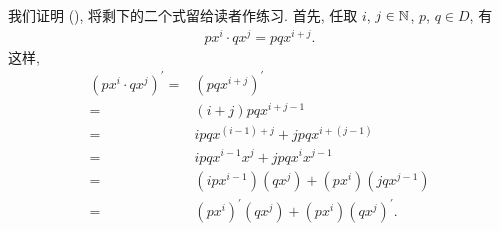 \begin{pf}
    我们证明 (), 将剩下的二个式留给读者作练习. 首先, 任取 $i$, $j \in \mathbb{N}$, $p$, $q \in D$, 有
    \begin{align*}
        px^i \cdot qx^j = pqx^{i+j}.
    \end{align*}
    这样,
    \begin{align*}
        (px^i \cdot qx^j)^{\prime}
        = {} & (pqx^{i+j})^{\prime}                             \\
        = {} & (i+j)pq x^{i+j-1}                                \\
        = {} & ipq x^{(i-1)+j} + jpq x^{i+(j-1)}                \\
        = {} & ipq x^{i-1} x^j + jpq x^i x^{j-1}                \\
        = {} & (ipx^{i-1}) (qx^j) + (px^i) (jqx^{j-1})          \\
        = {} & (px^i)^{\prime} (qx^j) + (px^i) (qx^j)^{\prime}.
    \end{align*}


\end{pf}
